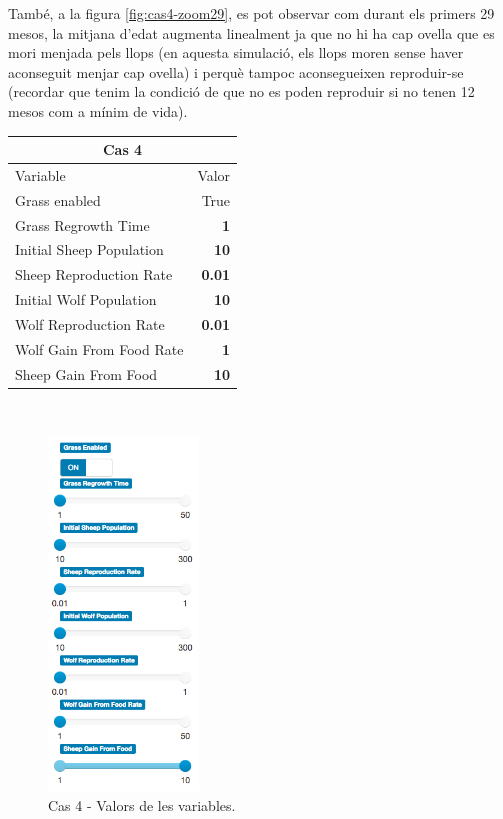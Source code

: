 \documentclass{article} %
\begin{document}
{	També, a la figura \ref{fig:cas4-zoom29}, es pot observar com durant els primers 29 mesos, la mitjana d'edat augmenta linealment ja que no hi ha cap ovella que es mori menjada pels llops (en aquesta simulació, els llops moren sense haver aconseguit menjar cap ovella) i perquè tampoc aconsegueixen reproduir-se (recordar que tenim la condició de que no es poden reproduir si no tenen 12 mesos com a mínim de vida). \\

	{\selectfont\small
	\begin{tabular}{l | r}
		\multicolumn{2}{c}{Cas 4}  \\ \hline
		Variable & Valor \\ \hline
		Grass enabled &  True  \\
		Grass Regrowth Time &  \textbf{1}  \\
		Initial Sheep Population &  \textbf{10}  \\
		Sheep Reproduction Rate &  \textbf{0.01}  \\
		Initial Wolf Population &  \textbf{10}  \\
		Wolf Reproduction Rate &  \textbf{0.01}  \\
		Wolf Gain From Food Rate &  \textbf{1}  \\
		Sheep Gain From Food &  \textbf{10}  \\
	\end{tabular}
	} \\

	\begin{figure}[H]
		\includegraphics[width=4cm]{mod_case_12_vars}
		\centering
		\color{blue}
		\caption{Cas 4 - Valors de les variables.}\label{visina8}
	\end{figure}

}
\end{document}
